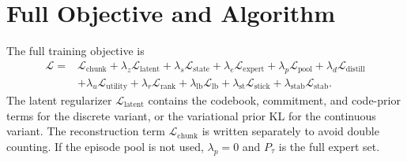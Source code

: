 \documentclass[10pt]{article}
\begin{document}
\section{Full Objective and Algorithm}

The full training objective is
\begin{align}
\mathcal{L}=&\mathcal{L}_{\mathrm{chunk}}
+\lambda_z\mathcal{L}_{\mathrm{latent}}
+\lambda_s\mathcal{L}_{\mathrm{state}}
+\lambda_e\mathcal{L}_{\mathrm{expert}}
+\lambda_p\mathcal{L}_{\mathrm{pool}}
+\lambda_d\mathcal{L}_{\mathrm{distill}} \nonumber\\
&+\lambda_u\mathcal{L}_{\mathrm{utility}}
+\lambda_r\mathcal{L}_{\mathrm{rank}}
+\lambda_{\mathrm{lb}}\mathcal{L}_{\mathrm{lb}}
+\lambda_{\mathrm{st}}\mathcal{L}_{\mathrm{stick}}
+\lambda_{\mathrm{stab}}\mathcal{L}_{\mathrm{stab}}.
\label{eq:full_objective}
\end{align}
The latent regularizer $\mathcal{L}_{\mathrm{latent}}$ contains the codebook, commitment, and code-prior terms for the discrete variant, or the variational prior KL for the continuous variant. The reconstruction term $\mathcal{L}_{\mathrm{chunk}}$ is written separately to avoid double counting. If the episode pool is not used, $\lambda_p=0$ and $P_\tau$ is the full expert set.
\end{document}
